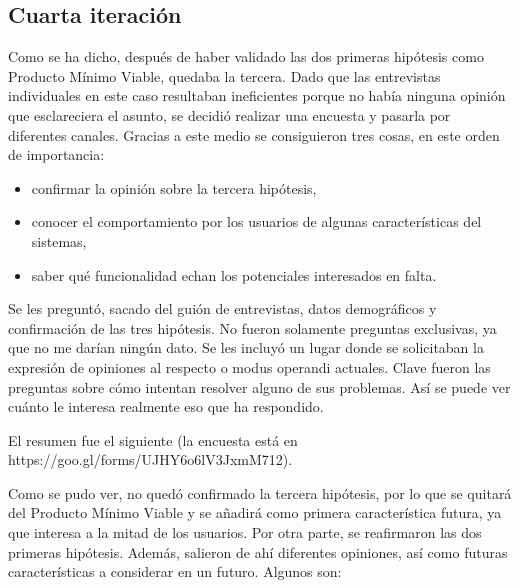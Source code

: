 
\subsection{Cuarta iteración}

Como se ha dicho, después de haber validado las dos primeras hipótesis como Producto Mínimo Viable, quedaba la tercera. Dado que las entrevistas individuales en este caso resultaban ineficientes porque no había ninguna opinión que esclareciera el asunto, se decidió realizar una encuesta y pasarla por diferentes canales. Gracias a este medio se consiguieron tres cosas, en este orden de importancia:

\begin{itemize}
    \item confirmar la opinión sobre la tercera hipótesis,
    \item conocer el comportamiento por los usuarios de algunas características del sistemas,
    \item saber qué funcionalidad echan los potenciales interesados en falta.
\end{itemize}

Se les preguntó, sacado del guión de entrevistas, datos demográficos y confirmación de las tres hipótesis. No fueron solamente preguntas exclusivas, ya que no me darían ningún dato. Se les incluyó un lugar donde se solicitaban la expresión de opiniones al respecto o modus operandi actuales. Clave fueron las preguntas sobre cómo intentan resolver alguno de sus problemas. Así se puede ver cuánto le interesa realmente eso que ha respondido.

El resumen fue el siguiente (la encuesta está en https://goo.gl/forms/UJHY6o6lV3JxmM712).



Como se pudo ver, no quedó confirmado la tercera hipótesis, por lo que se quitará del Producto Mínimo Viable y se añadirá como primera característica futura, ya que interesa a la mitad de los usuarios. Por otra parte, se reafirmaron las dos primeras hipótesis. Además, salieron de ahí diferentes opiniones, así como futuras características a considerar en un futuro. Algunos son:

